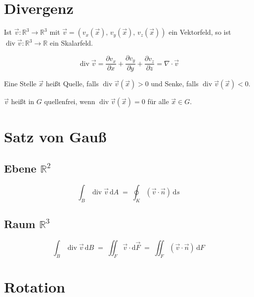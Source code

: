 \documentclass[a4paper,11pt,oneside,open=any,parskip=half, DIV=15]{scrreprt}
\begin{document}
\section{Divergenz}

   Ist \(\vec{v}:\mathbb{R}^3\to\mathbb{R}^3\) mit
   \(\vec{v}=(v_x(\vec{x}),\,v_y(\vec{x}),\,v_z(\vec{x}))\) ein Vektorfeld,
   so ist \(\operatorname{div}\vec{v}:\mathbb{R}^3\to\mathbb{R}\) ein Skalarfeld.

   \begin{importantbox}
      \[
         \operatorname{div}\vec{v}
         =\frac{\partial v_x}{\partial x}
         +\frac{\partial v_y}{\partial y}
         +\frac{\partial v_z}{\partial z}
         =\nabla\cdot\vec{v}
      \]
   \end{importantbox}

   Eine Stelle \(\vec{x}\) heißt Quelle, falls \(\operatorname{div}\vec{v}(\vec{x})>0\) und Senke, falls \(\operatorname{div}\vec{v}(\vec{x})<0\).

   \(\vec{v}\) heißt in \(G\) quellenfrei, wenn \(\operatorname{div}\vec{v}(\vec{x})=0\) für alle \(\vec{x}\in G\).

\section{Satz von Gauß}

\subsection*{Ebene \(\mathbb{R}^2\)}
   \begin{importantbox}
      \[
         \int_B \operatorname{div}\vec v\,\mathrm dA
         \;=\;
         \oint_K (\vec v\cdot \vec n)\,\mathrm ds
      \] 
   \end{importantbox}

\subsection*{Raum \(\mathbb{R}^3\)}
   \begin{importantbox}
      \[
         \int_B \operatorname{div}\vec v\,\mathrm{d}B
         \;=\;
         \iint_F \vec v\cdot \mathrm d\vec F
         \;=\;
         \iint_F (\vec v\cdot \vec n)\,\mathrm{d}F
      \]
   \end{importantbox}

\newpage
\section{Rotation}
\end{document}
